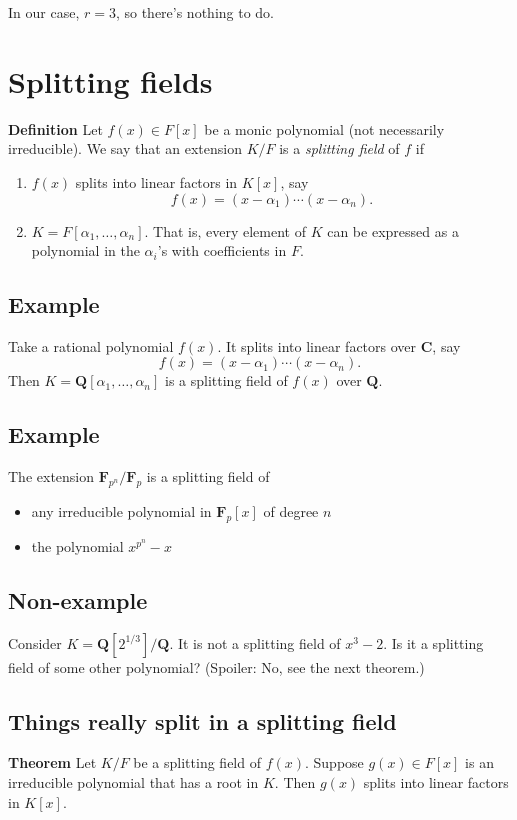 \documentclass[11pt]{article}
\begin{document}
In our case, \(r = 3\), so there's nothing to do.
\section{Splitting fields}
\label{sec:org2f8d4c0}
\textbf{Definition} Let \(f(x) \in F[x]\) be a monic polynomial (not necessarily irreducible).
We say that an extension \(K/F\) is a \emph{splitting field} of \(f\) if
\begin{enumerate}
\item \(f(x)\) splits into linear factors in \(K[x]\), say
\[ f(x) = (x-\alpha_{1}) \cdots (x-\alpha_{n}).\]
\item \(K = F[\alpha_1,\dots, \alpha_n].\)
That is, every element of \(K\) can be expressed as a polynomial in the \(\alpha_{i}\)'s with coefficients in \(F\).
\end{enumerate}
\subsection{Example}
\label{sec:org726a35c}
Take a rational polynomial \(f(x)\).  It splits into linear factors over \(\mathbf{C}\), say
\[ f(x) = (x-\alpha_{1}) \cdots (x-\alpha_{n}).\]
Then \(K = \mathbf{Q}[\alpha_1,\dots,\alpha_n]\) is a splitting field of \(f(x)\) over \(\mathbf{Q}\).
\subsection{Example}
\label{sec:org27a61db}
The extension \(\mathbf{F}_{p^{n}}/ \mathbf{F}_p\) is a splitting field of
\begin{itemize}
\item any irreducible polynomial in \(\mathbf{F}_p[x]\) of degree \(n\)
\item the polynomial \(x^{p^n}-x\)
\end{itemize}
\subsection{Non-example}
\label{sec:org8ee295b}
Consider \(K = \mathbf{Q}[2^{1/3}] / \mathbf{Q}\).
It is not a splitting field of \(x^3-2\).
Is it a splitting field of some other polynomial? (Spoiler: No, see the next theorem.)
\subsection{Things really split in a splitting field}
\label{sec:org06db1ff}
\textbf{Theorem} Let \(K/F\) be a splitting field of \(f(x)\).
Suppose \(g(x) \in F[x]\) is an irreducible polynomial that has a root in \(K\).
Then \(g(x)\) splits into linear factors in \(K[x]\).
\end{document}
